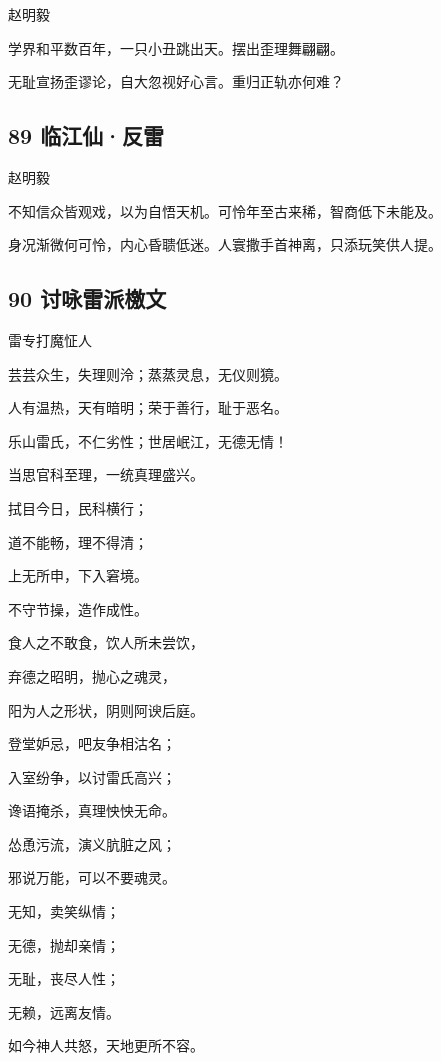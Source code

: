 {赵明毅}

学界和平数百年，一只小丑跳出天。摆出歪理舞翩翩。

无耻宣扬歪谬论，自大忽视好心言。重归正轨亦何难？ ~\\

\hypertarget{ux4e34ux6c5fux4ed9ux53cdux96f7}{%
\subsection{89 临江仙·反雷}\label{ux4e34ux6c5fux4ed9ux53cdux96f7}}

{赵明毅}

不知信众皆观戏，以为自悟天机。可怜年至古来稀，智商低下未能及。

身况渐微何可怜，内心昏聩低迷。人寰撒手首神离，只添玩笑供人提。

\hypertarget{ux8ba8ux548fux96f7ux6d3eux6a84ux6587}{%
\subsection{90
讨咏雷派檄文}\label{ux8ba8ux548fux96f7ux6d3eux6a84ux6587}}

{雷专打魔怔人}

芸芸众生，失理则泠；蒸蒸灵息，无仪则獍。

人有温热，天有暗明；荣于善行，耻于恶名。

乐山雷氏，不仁劣性；世居岷江，无德无情！

当思官科至理，一统真理盛兴。

拭目今日，民科横行；

道不能畅，理不得清；

上无所申，下入窘境。

不守节操，造作成性。

食人之不敢食，饮人所未尝饮，

弃德之昭明，抛心之魂灵，

阳为人之形状，阴则阿谀后庭。

登堂妒忌，吧友争相沽名；

入室纷争，以讨雷氏高兴；

谗语掩杀，真理怏怏无命。

怂恿污流，演义肮脏之风；

邪说万能，可以不要魂灵。

无知，卖笑纵情；

无德，抛却亲情；

无耻，丧尽人性；

无赖，远离友情。

如今神人共怒，天地更所不容。

